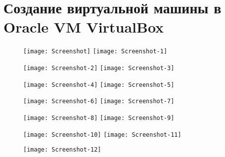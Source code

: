 \section{Создание виртуальной машины в Oracle VM VirtualBox} \label{pril:a}

\begin{figure}[ht]
    \centering
	\texttt{[image: Screenshot]}
	\texttt{[image: Screenshot-1]}
\end{figure}

\begin{figure}[ht]
    \centering
	\texttt{[image: Screenshot-2]}
	\texttt{[image: Screenshot-3]}
\end{figure}

\begin{figure}[ht]
    \centering
	\texttt{[image: Screenshot-4]}
	\texttt{[image: Screenshot-5]}
\end{figure}

\begin{figure}[ht]
    \centering
	\texttt{[image: Screenshot-6]}
	\texttt{[image: Screenshot-7]}
\end{figure}

\begin{figure}[ht]
    \centering
	\texttt{[image: Screenshot-8]}
	\texttt{[image: Screenshot-9]}
\end{figure}

\begin{figure}[ht]
    \centering
	\texttt{[image: Screenshot-10]}
	\texttt{[image: Screenshot-11]}
\end{figure}

\begin{figure}[ht]
    \centering
	\texttt{[image: Screenshot-12]}
\end{figure}

\clearpage
